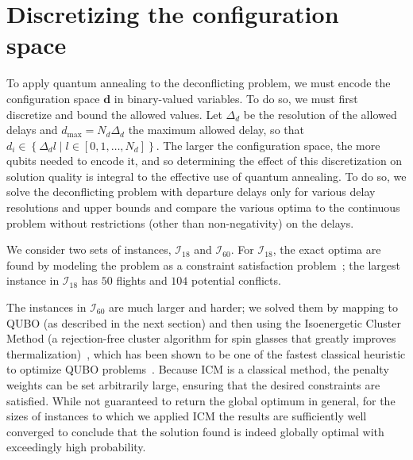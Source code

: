 \section{Discretizing the configuration space}
To apply quantum annealing to the deconflicting problem, we must encode the configuration space $\mathbf d$ in binary-valued variables.
To do so, we must first discretize and bound the allowed values.
Let $\Delta_d$ be the resolution of the allowed delays and $d_{\max} = N_d \Delta_d$ the maximum allowed delay, so that $d_i \in \left\{\Delta_d l \middle| l \in [0, 1, \ldots, N_d]\right\}$.
The larger the configuration space, the more qubits needed to encode it, and so determining the effect of this discretization on solution quality is integral to the effective use of quantum annealing.
To do so, we solve the deconflicting problem with departure delays only for various delay resolutions and upper bounds and compare the various optima to the continuous problem without restrictions (other than non-negativity) on the delays.

We consider two sets of instances, $\mathcal I_{18}$ and $\mathcal I_{60}$.
For $\mathcal I_{18}$, the exact optima are found by modeling the problem as a constraint satisfaction problem~\cite{numberjack}; the largest instance in $\mathcal I_{18}$ has $50$ flights and $104$ potential conflicts.

The instances in $\mathcal I_{60}$ are much larger and harder; we solved them by mapping to QUBO (as described in the next section) and then using the Isoenergetic Cluster Method (a
rejection-free cluster algorithm for spin glasses that greatly improves
thermalization)~\cite{zhu2015}, which has been shown to be one of the fastest
classical heuristic to optimize QUBO problems~\cite{mandra2016}.
Because ICM is a classical method, the penalty weights can be set arbitrarily large, ensuring that the desired constraints are satisfied.
While not guaranteed to return the global optimum in general, for the sizes of instances to which we applied ICM the results are sufficiently well converged to conclude that the solution found is indeed globally optimal with exceedingly high probability.


